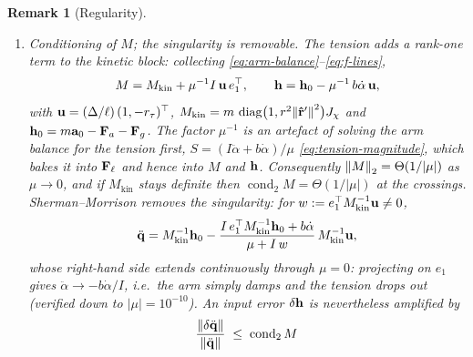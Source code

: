 \documentclass[10pt, a4paper]{article}
\newtheorem{remark}{Remark}
\begin{document}
\begin{remark}[Regularity]
\begin{enumerate}
        Exactly on the set evaluation must be avoided anyway: in floating
        point $\sin(\phi - \alpha) = 0$ makes $\kappa = I/\mu$ a
        \texttt{NaN}, so the implementation starts the lemniscate at
        $\tau_0 = 10^{-10}$ rather than $0$ (\texttt{TAU0} in
        \texttt{src/KEEP.jl}).  The model also requires $S \ge 0$ (lines
        cannot push); on the monitored cycle $S \in [2.8, 9.5]$\,kN.  The
        singularity itself is removable, as item 3 shows.
        \item \emph{Conditioning of $M$; the singularity is removable.}
        The tension adds a rank-one term to the kinetic block: collecting
        \eqref{eq:arm-balance}--\eqref{eq:f-lines},
        \begin{equation*}
            M = M_{\mathrm{kin}} + \mu^{-1} I\, \vb u\, e_1^\top,
            \qquad
            \vb h = \vb h_0 - \mu^{-1}\, b\dot\alpha\, \vb u,
        \end{equation*}
        with $\vb u = (\Delta/\ell)\,(1, -r_\tau)^\top$,
        $M_{\mathrm{kin}} = m\,\operatorname{diag}\bigl(1,
        r^2\norm{\vu r'}^2\bigr) J_\chi$ and
        $\vb h_0 = m\vb a_0 - \vb F_a - \vb F_g$.  The factor $\mu^{-1}$
        is an artefact of solving the arm balance for the tension first,
        $S = (I\ddot\alpha + b\dot\alpha)/\mu$
        \eqref{eq:tension-magnitude}, which bakes it into $\vb F_\ell$
        and hence into $M$ and $\vb h$.  Consequently
        $\norm{M}_2 = \Theta(1/\lvert\mu\rvert)$ as $\mu \to 0$, and if
        $M_{\mathrm{kin}}$ stays definite then
        $\operatorname{cond}_2 M = \Theta(1/\lvert\mu\rvert)$ at the
        crossings.  Sherman--Morrison removes the singularity: for
        $w := e_1^\top M_{\mathrm{kin}}^{-1} \vb u \ne 0$,
        \begin{equation*}
            \ddot{\vb q}
            = M_{\mathrm{kin}}^{-1} \vb h_0
            - \frac{I\, e_1^\top M_{\mathrm{kin}}^{-1} \vb h_0
            + b\dot\alpha}{\mu + I\,w}\,
            M_{\mathrm{kin}}^{-1} \vb u ,
        \end{equation*}
        whose right-hand side extends continuously through $\mu = 0$:
        projecting on $e_1$ gives $\ddot\alpha \to -b\dot\alpha/I$, i.e.\
        the arm simply damps and the tension drops out (verified down to
        $\lvert\mu\rvert = 10^{-10}$).  An input error $\delta\vb h$ is
        nevertheless amplified by
        \begin{equation*}
            \frac{\norm{\delta\ddq}}{\norm{\ddq}}
            \;\le\; \operatorname{cond}_2 M\,

\end{equation*}
\end{enumerate}
\end{remark}
\end{document}
